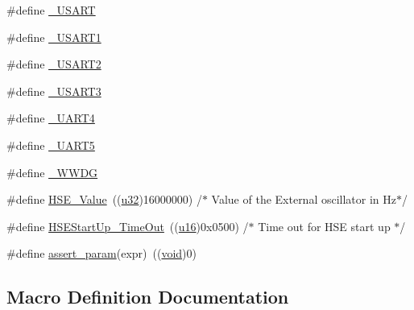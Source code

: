 \begin{DoxyCompactItemize}
\item 
\#define \hyperlink{bsp_2boards_2iot-lab___m3_2configure_2stm32f10x__conf_8h_a721f8180518da65e41da9183b51e3e8f}{\+\_\+\+U\+S\+A\+RT}
\item 
\#define \hyperlink{bsp_2boards_2iot-lab___m3_2configure_2stm32f10x__conf_8h_a87cc61af3196eff32399adcb150efc02}{\+\_\+\+U\+S\+A\+R\+T1}
\item 
\#define \hyperlink{bsp_2boards_2iot-lab___m3_2configure_2stm32f10x__conf_8h_ae4b518a21a49480699d8e1c72ee54ca1}{\+\_\+\+U\+S\+A\+R\+T2}
\item 
\#define \hyperlink{bsp_2boards_2iot-lab___m3_2configure_2stm32f10x__conf_8h_a1d0c868ba49fcc013de7cc9e9a7e4728}{\+\_\+\+U\+S\+A\+R\+T3}
\item 
\#define \hyperlink{bsp_2boards_2iot-lab___m3_2configure_2stm32f10x__conf_8h_af0db70c5bcd5675b2c9779656d440b6b}{\+\_\+\+U\+A\+R\+T4}
\item 
\#define \hyperlink{bsp_2boards_2iot-lab___m3_2configure_2stm32f10x__conf_8h_a14bc584303e9158a345f49add421ef23}{\+\_\+\+U\+A\+R\+T5}
\item 
\#define \hyperlink{bsp_2boards_2iot-lab___m3_2configure_2stm32f10x__conf_8h_a0805659aa3ffd3f906b888b0d36a3e13}{\+\_\+\+W\+W\+DG}
\item 
\#define \hyperlink{bsp_2boards_2iot-lab___m3_2configure_2stm32f10x__conf_8h_ab12a1abe6dd0001e7a0487a8b175b28c}{H\+S\+E\+\_\+\+Value}~((\hyperlink{agilefox_2library_2inc_2stm32f10x__type_8h_a2caf5cd7bcdbe1eefa727f44ffb10bac}{u32})16000000) /$\ast$ Value of the External oscillator in Hz$\ast$/
\item 
\#define \hyperlink{bsp_2boards_2iot-lab___m3_2configure_2stm32f10x__conf_8h_a7e69dacd5c3b950b5b1786d7336b30d3}{H\+S\+E\+Start\+Up\+\_\+\+Time\+Out}~((\hyperlink{agilefox_2library_2inc_2stm32f10x__type_8h_a9e6c91d77e24643b888dbd1a1a590054}{u16})0x0500) /$\ast$ Time out for H\+S\+E start up $\ast$/
\item 
\#define \hyperlink{bsp_2boards_2iot-lab___m3_2configure_2stm32f10x__conf_8h_a631dea7b230e600555f979c62af1de21}{assert\+\_\+param}(expr)~((\hyperlink{usb__devapi_8h_afabf60e7f57651d6d595a02c75f07cd0}{void})0)
\end{DoxyCompactItemize}


\subsection{Macro Definition Documentation}
